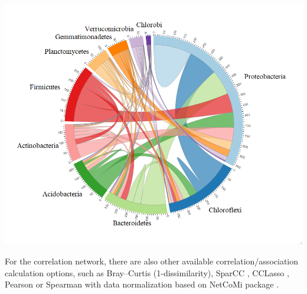 \documentclass[
]{book}
\newenvironment{Shaded}{\begin{snugshade}}{\end{snugshade}}
\newcommand{\AttributeTok}[1]{\textcolor[rgb]{0.77,0.63,0.00}{#1}}
\newcommand{\CommentTok}[1]{\textcolor[rgb]{0.56,0.35,0.01}{\textit{#1}}}
\newcommand{\ConstantTok}[1]{\textcolor[rgb]{0.00,0.00,0.00}{#1}}
\newcommand{\DecValTok}[1]{\textcolor[rgb]{0.00,0.00,0.81}{#1}}
\newcommand{\FunctionTok}[1]{\textcolor[rgb]{0.00,0.00,0.00}{#1}}
\newcommand{\NormalTok}[1]{#1}
\newcommand{\SpecialCharTok}[1]{\textcolor[rgb]{0.00,0.00,0.00}{#1}}
\newcommand{\StringTok}[1]{\textcolor[rgb]{0.31,0.60,0.02}{#1}}
\begin{document}
\begin{Shaded}
\end{Shaded}

\begin{center}\includegraphics[width=700px]{Images/plot_sum_links} \end{center}

For the correlation network, there are also other available correlation/association calculation options,
such as Bray--Curtis (1-dissimilarity), SparCC \citep{Friedman_Inferring_2012}, CCLasso \citep{Fang_CCLasso_2015},
Pearson or Spearman with data normalization based on NetCoMi package \citep{Peschel_NetCoMi_2021}.
\end{document}
